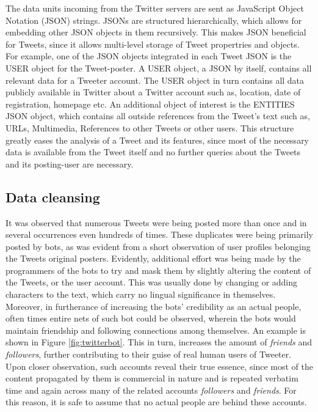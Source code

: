 			\par
			
			The data units incoming from the Twitter servers are sent as JavaScript Object Notation (JSON) strings. JSONs are structured hierarchically, which allows for embedding other JSON objects in them recursively. This makes JSON beneficial for Tweets, since it allows multi-level storage of Tweet propertries and objects. For example, one of the JSON objects integrated in each Tweet JSON is the USER object for the Tweet-poster. A USER object, a JSON by itself, contains all relevant data for a Tweeter account. The USER object in turn contains all data publicly available in Twitter about a Twitter account such as, location, date of registration, homepage etc. An additional object of interest is the ENTITIES JSON object, which contains all outside references from the Tweet's text such as, URLs, Multimedia, References to other Tweets or other users. 
			This structure greatly eases the analysis of a Tweet and its features, since most of the necessary data is available from the Tweet itself and no further queries about the Tweets and its posting-user are necessary.
			\par
		
		\subsection{Data cleansing}
			It was observed that numerous Tweets were being posted more than once and in several occurrences even hundreds of times. These duplicates were being primarily posted by bots, as was evident from a short observation of user profiles belonging the Tweets original posters. Evidently, additional effort was being made by the programmers of the bots to try and mask them by slightly altering the content of the Tweets, or the user account. This was usually done by changing or adding characters to the text, which carry no lingual significance in themselves. Moreover, in furtherance of increasing the bots' credibility as an actual people, often times entire nets of such bot could be observed, wherein the bots would maintain friendship and following connections among themselves. An example is shown in Figure \ref{fig:twitterbot}. This in turn, increases the amount of \textit{friends} and \textit{followers}, further contributing to their guise of real human users of Tweeter. Upon closer observation, such accounts reveal their true essence, since most of the content propagated by them is commercial in nature and is repeated verbatim time and again across many of the related accounts \textit{followers} and \textit{friends}. For this reason, it is safe to assume that no actual people are behind these accounts. 
			\par
			

